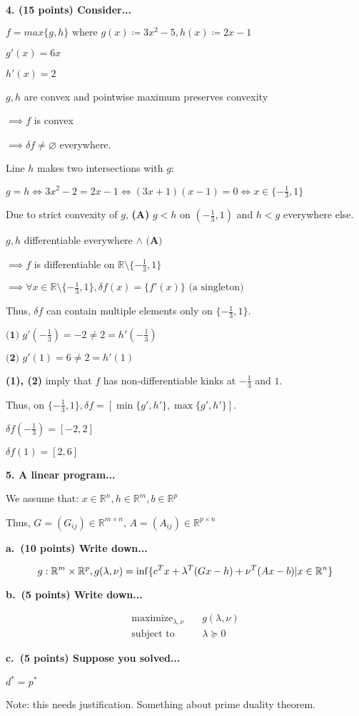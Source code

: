 \documentclass[a4paper,10pt]{article}
\theoremstyle{definition}
\begin{document}
\bigskip
\textbf{4. (15 points) Consider...}

$f = max\{g, h\} \text{ where } g(x) \coloneq 3x^2 - 5, h(x) \coloneq 2x - 1$

$g'(x) = 6x$

$h'(x) = 2$

$g,h$ are convex and pointwise maximum preserves convexity

$\implies f$ is convex

$\implies \delta f \neq \varnothing$ everywhere.

Line $h$ makes two intersections with $g$:

$g = h \iff 3x^2 - 2 = 2x - 1 \iff (3x + 1)(x - 1) = 0 \iff x \in \{-\frac{1}{3}, 1\}$

Due to strict convexity of $g$, \textbf{(A)} $g < h$ on $(-\frac{1}{3}, 1)$ and $h < g$ everywhere else.

$g, h$ differentiable everywhere $\land \textbf{ (A)}$

$\implies f$ is differentiable on $\mathbb{R} \setminus \{-\frac{1}{3}, 1\}$

$\implies \forall x \in \mathbb{R} \setminus \{-\frac{1}{3}, 1\}, \delta f(x) = \{f'(x)\} \text{ (a singleton)}$

Thus, $\delta f$ can contain multiple elements only on $\{-\frac{1}{3}, 1\}$.

$\textbf{(1) } g'(-\frac{1}{3}) = -2 \neq 2 = h'(-\frac{1}{3})$

$\textbf{(2) } g'(1) = 6 \neq 2 = h'(1)$

\textbf{(1), (2)} imply that $f$ has non-differentiable kinks at $-\frac{1}{3}$ and $1$.

Thus, on $\{-\frac{1}{3}, 1\}, \delta f = [\min\{g', h'\},\max\{g', h'\}]$.

$\delta f(-\frac{1}{3}) = [-2, 2]$

$\delta f(1) = [2, 6]$



\bigskip
\textbf{5. A linear program...}

We assume that:
$x \in \mathbb{R}^n, h \in \mathbb{R}^m, b \in \mathbb{R}^p$

Thus, $G = (G_{ij}) \in \mathbb{R}^{m \times n}$, $A = (A_{ij}) \in \mathbb{R}^{p \times n}$

\textbf{a. (10 points) Write down...}

\[
    g:\mathbb{R}^m \times \mathbb{R}^p, \\
    g(\lambda, \nu) = \inf\{
        c^Tx + \lambda^{T}(Gx - h) + \nu^{T}(Ax - b)
        |x\in\mathbb{R}^n
    \}
\]

\textbf{b. (5 points) Write down...}

\[
\begin{aligned}
    \text{maximize}_{\lambda, \nu} \quad & g(\lambda, \nu) \\
    \text{subject to} \quad & \lambda \succeq 0
\end{aligned}
\]


\textbf{c. (5 points) Suppose you solved...}

$d^* = p^*$

Note: this needs justification. Something about prime duality theorem.
\end{document}
